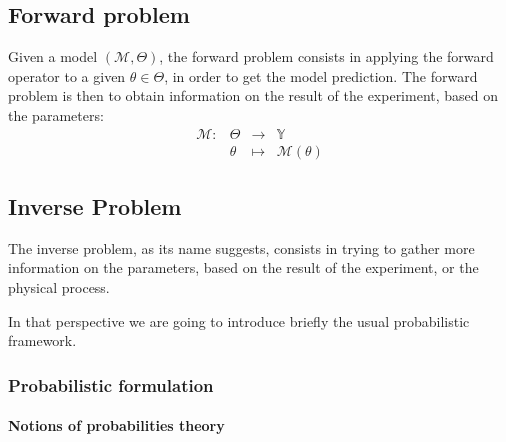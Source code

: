 \documentclass[a4paper,11pt]{article}
\newcommand{\Yspace}{\mathbb{Y}}
\theoremstyle{defi}
\numberwithin{thmCounter}{section}
\begin{document}
\subsection{Forward problem}
Given a model $(\mathcal{M}, \Theta)$, the forward problem consists in applying the forward operator to a given $\theta \in \Theta$, in order to get the model prediction. The forward problem is then to obtain information on the result of the experiment, based on the parameters:
\begin{equation*}
  \begin{array}{cccc}
    \mathcal{M}:&\Theta&\longrightarrow & \Yspace \\
                & \theta & \longmapsto & \mathcal{M}(\theta)
  \end{array}
\end{equation*}

\subsection{Inverse Problem}
The inverse problem, as its name suggests, consists in trying to gather more information on the parameters, based on the result of the experiment, or the physical process.

In that perspective we are going to introduce briefly the usual probabilistic framework.
\subsubsection{Probabilistic formulation}

\paragraph{Notions of probabilities theory}
\label{sec:notion_prob_theory}
\end{document}
